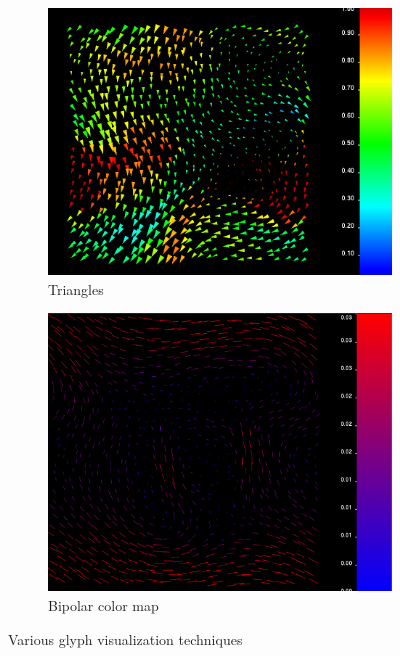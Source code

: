 \begin{figure}[htb]
\begin{subfigure}[htb]{.49\textwidth}
		        \includegraphics[width =\textwidth]{content/pictures/triangles.png}
		        \caption{Triangles}
		        \label{fig:triangles}
		    \end{subfigure}
		    \begin{subfigure}[htb]{.49\textwidth}
		        \includegraphics[width =\textwidth]{content/pictures/bipolar_glyphs.png}
		        \caption{Bipolar color map}
		        \label{fig:bipolar}
		    \end{subfigure}
		    \caption{Various glyph visualization techniques}
		    \label{fig:glyph_shapes}
		\end{figure}
